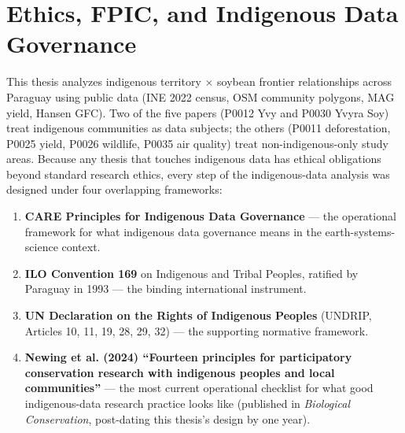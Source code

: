 %
%

\chapter{Ethics, FPIC, and Indigenous Data Governance}
\label{ch:appendix:ethics}

This thesis analyzes indigenous territory $\times$ soybean frontier
relationships across Paraguay using public data (INE 2022 census,
OSM community polygons, MAG yield, Hansen GFC). Two of the
five papers (P0012 Yvy and P0030 Yvyra Soy) treat indigenous
communities as data subjects; the others (P0011 deforestation,
P0025 yield, P0026 wildlife, P0035 air quality) treat
non-indigenous-only study areas. Because any thesis that touches
indigenous data has ethical obligations beyond standard research
ethics, every step of the indigenous-data analysis was designed
under four overlapping frameworks:

\begin{enumerate}
    \item \textbf{CARE Principles for Indigenous Data Governance}
      \citep{gida2019,carroll2020care,jennings2025} --- the operational
      framework for what indigenous data governance means in the
      earth-systems-science context.
    \item \textbf{ILO Convention 169} on Indigenous and Tribal
      Peoples, ratified by Paraguay in 1993 --- the binding
      international instrument.
    \item \textbf{UN Declaration on the Rights of Indigenous
      Peoples} (UNDRIP, Articles 10, 11, 19, 28, 29, 32) --- the
      supporting normative framework.
    \item \textbf{Newing et al. (2024) ``Fourteen principles for
      participatory conservation research with indigenous peoples
      and local communities''} \citep{newing2024} --- the most
      current operational checklist for what good indigenous-data
      research practice looks like (published in \emph{Biological
      Conservation}, post-dating this thesis's design by one year).
\end{enumerate}

